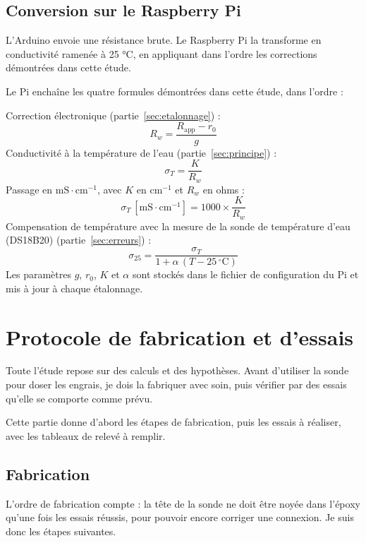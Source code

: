 \documentclass[11pt,a4paper]{article}
\newcommand{\U}[1]{\,\mathrm{#1}}
\begin{document}
\subsection{Conversion sur le Raspberry Pi}

L'Arduino envoie une résistance brute. Le Raspberry Pi la transforme en conductivité ramenée à 25 °C, en appliquant dans l'ordre les corrections démontrées dans cette étude.


Le Pi enchaîne les quatre formules démontrées dans cette étude, dans l'ordre :

Correction électronique (partie~\ref{sec:etalonnage}) :
\[
R_w = \frac{R_{\text{app}} - r_0}{g}
\]
Conductivité à la température de l'eau (partie~\ref{sec:principe}) :
\[
\sigma_T = \frac{K}{R_w}
\]
Passage en $\mathrm{mS \cdot cm^{-1}}$, avec $K$ en $\mathrm{cm^{-1}}$ et $R_w$ en ohms :
\[
\sigma_T \,[\mathrm{mS \cdot cm^{-1}}] = 1000 \times \frac{K}{R_w}
\]
Compensation de température avec la mesure de la sonde de température d'eau (DS18B20) (partie~\ref{sec:erreurs}) :
\[
\sigma_{25} = \frac{\sigma_T}{1 + \alpha \, (T - 25\U{{}^{\circ}C})}
\]
Les paramètres $g$, $r_0$, $K$ et $\alpha$ sont stockés dans le fichier de configuration du Pi et mis à jour à chaque étalonnage.

\newpage
\section{Protocole de fabrication et d'essais}
\label{sec:protocole}

Toute l'étude repose sur des calculs et des hypothèses. Avant d'utiliser la sonde pour doser les engrais, je dois la fabriquer avec soin, puis vérifier par des essais qu'elle se comporte comme prévu.

Cette partie donne d'abord les étapes de fabrication, puis les essais à réaliser, avec les tableaux de relevé à remplir.


\subsection{Fabrication}

L'ordre de fabrication compte : la tête de la sonde ne doit être noyée dans l'époxy qu'une fois les essais réussis, pour pouvoir encore corriger une connexion. Je suis donc les étapes suivantes.
\end{document}
